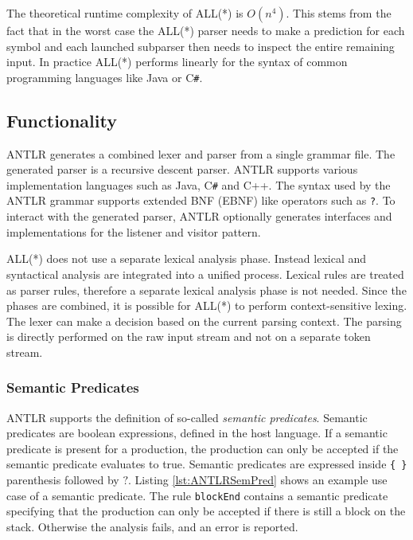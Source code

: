 The theoretical runtime complexity of ALL(*) is $O(n^4)$. This stems from the fact that in the worst case the ALL(*) parser needs to make a prediction for each symbol and each launched subparser then needs to inspect the entire remaining input. In practice ALL(*) performs linearly for the syntax of common programming languages like Java or C\verb|#|.


\subsection{Functionality}

ANTLR generates a combined lexer and parser from a single grammar file. The generated parser is a recursive descent parser. ANTLR supports various implementation languages such as Java, C\verb|#| and C++. The syntax used by the ANTLR grammar supports extended BNF (EBNF) like operators such as \texttt{?}. To interact with the generated parser, ANTLR optionally generates interfaces and implementations for the listener and visitor pattern.

ALL(*) does not use a separate lexical analysis phase. Instead lexical and syntactical analysis are integrated into a unified process. Lexical rules are treated as parser rules, therefore a separate lexical analysis phase is not needed. Since the phases are combined, it is possible for ALL(*) to perform context-sensitive lexing. The lexer can make a decision based on the current parsing context. The parsing is directly performed on the raw input stream and not on a separate token stream. 

\subsubsection{Semantic Predicates}

ANTLR supports the definition of so-called \textit{semantic predicates}. Semantic predicates are boolean expressions, defined in the host language. If a semantic predicate is present for a production, the production can only be accepted if the semantic predicate evaluates to true. Semantic predicates are expressed inside \verb|{ }| parenthesis followed by $?$. Listing \ref{lst:ANTLRSemPred} shows an example use case of a semantic predicate. The rule \texttt{blockEnd} contains a semantic predicate specifying that the production can only be accepted if there is still a block on the stack. Otherwise the analysis fails, and an error is reported.

